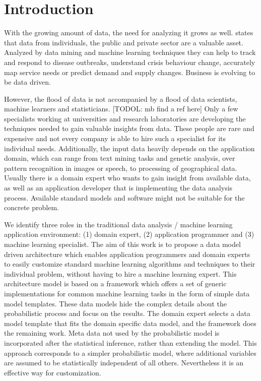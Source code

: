 \section{Introduction}

With the growing amount of data, the need for analyzing it grows as well. \textcite{forum2012bigdata} states that data from individuals, the public and private sector are a valuable asset. Analyzed by data mining and machine learning techniques they can help to track and respond to disease outbreaks, understand crisis behaviour change, accurately map service needs or predict demand and supply changes. Business is evolving to be data driven.

However, the flood of data is not accompanied by a flood of data scientists, machine learners and statisticians. [TODOL: mb find a ref here] Only a few specialists working at universities and research laboratories are developing the techniques needed to gain valuable insights from data. These people are rare and expensive and not every company is able to hire such a specialist for its individual needs. Additionally, the input data heavily depends on the application domain, which can range from text mining tasks and genetic analysis, over pattern recognition in images or speech, to processing of geographical data. Usually there is a domain expert who wants to gain insight from available data, as well as an application developer that is implementing the data analysis process. Available standard models and software might not be suitable for the concrete problem.

We identify three roles in the traditional data analysis / machine learning application environment: (1) domain expert, (2) application programmer and (3) machine learning specialist. The aim of this work is to propose a data model driven architecture which enables application programmers and domain experts to easily customize standard machine learning algorithms and techniques to their individual problem, without having to hire a machine learning expert. This architecture model is based on a framework which offers a set of generic implementations for common machine learning tasks in the form of simple data model templates. These data models hide the complex details about the probabilistic process and focus on the results. The domain expert selects a data model template that fits the domain specific data model, and the framework does the remaining work. Meta data not used by the probabilistic model is incorporated after the statistical inference, rather than extending the model. This approach corresponds to a simpler probabilistic model, where additional variables are assumed to be statistically independent of all others. Nevertheless it is an effective way for customization.

